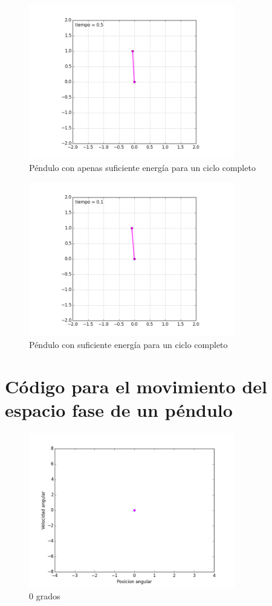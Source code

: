\documentclass[12pt]{article}
\begin{document}
\begin{figure}[H]
		\centering
	\includegraphics[width=9cm]{j.png}
	\caption{Péndulo con apenas suficiente energía para un ciclo completo}
\end{figure}

\begin{figure}[H]
		\centering
	\includegraphics[width=9cm]{s.png}
	\caption{Péndulo con suficiente energía para un ciclo completo}
\end{figure}


\section{Código para el movimiento del espacio fase de un péndulo}




\begin{figure}[H]
		\centering
	\includegraphics[width=9cm]{0f.png}
	\caption{0 grados}
\end{figure}
\end{document}
